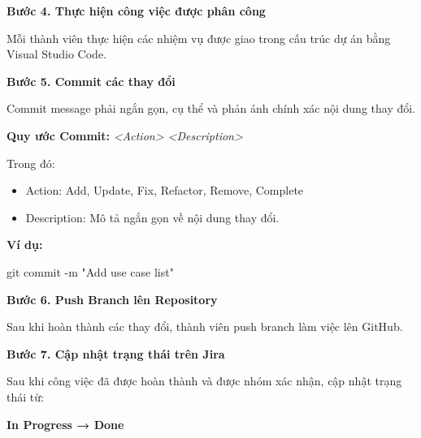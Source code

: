 \textbf{Bước 4. Thực hiện công việc được phân công}

Mỗi thành viên thực hiện các nhiệm vụ được giao trong cấu trúc dự án bằng Visual Studio Code.

\textbf{Bước 5. Commit các thay đổi}

Commit message phải ngắn gọn, cụ thể và phản ánh chính xác nội dung thay đổi.

\textbf{Quy ước Commit:} \emph{\textless Action\textgreater{} \textless Description\textgreater{}}

Trong đó:

\begin{itemize}
\item
  Action: Add, Update, Fix, Refactor, Remove, Complete
\item
  Description: Mô tả ngắn gọn về nội dung thay đổi.
\end{itemize}

\textbf{Ví dụ:}

git commit -m "Add use case list"

\textbf{Bước 6. Push Branch lên Repository}

Sau khi hoàn thành các thay đổi, thành viên push branch làm việc lên GitHub.

\textbf{Bước 7. Cập nhật trạng thái trên Jira}

Sau khi công việc đã được hoàn thành và được nhóm xác nhận, cập nhật trạng thái từ:

\textbf{In Progress → Done}

